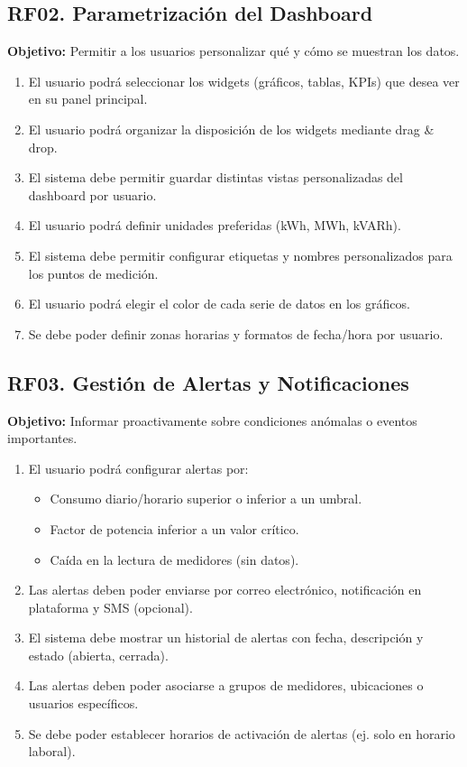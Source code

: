 \documentclass[12pt,a4paper]{article}
\begin{document}
\subsection{RF02. Parametrización del Dashboard}

\textbf{Objetivo:} Permitir a los usuarios personalizar qué y cómo se muestran los datos.

\begin{enumerate}[label=RF02.\arabic*]
    \item El usuario podrá seleccionar los widgets (gráficos, tablas, KPIs) que desea ver en su panel principal.
    \item El usuario podrá organizar la disposición de los widgets mediante drag \& drop.
    \item El sistema debe permitir guardar distintas vistas personalizadas del dashboard por usuario.
    \item El usuario podrá definir unidades preferidas (kWh, MWh, kVARh).
    \item El sistema debe permitir configurar etiquetas y nombres personalizados para los puntos de medición.
    \item El usuario podrá elegir el color de cada serie de datos en los gráficos.
    \item Se debe poder definir zonas horarias y formatos de fecha/hora por usuario.
\end{enumerate}

\subsection{RF03. Gestión de Alertas y Notificaciones}

\textbf{Objetivo:} Informar proactivamente sobre condiciones anómalas o eventos importantes.

\begin{enumerate}[label=RF03.\arabic*]
    \item El usuario podrá configurar alertas por:
    \begin{itemize}
        \item Consumo diario/horario superior o inferior a un umbral.
        \item Factor de potencia inferior a un valor crítico.
        \item Caída en la lectura de medidores (sin datos).
    \end{itemize}
    \item Las alertas deben poder enviarse por correo electrónico, notificación en plataforma y SMS (opcional).
    \item El sistema debe mostrar un historial de alertas con fecha, descripción y estado (abierta, cerrada).
    \item Las alertas deben poder asociarse a grupos de medidores, ubicaciones o usuarios específicos.
    \item Se debe poder establecer horarios de activación de alertas (ej. solo en horario laboral).
\end{enumerate}
\end{document}
